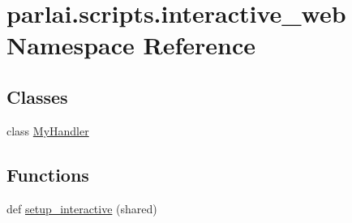 \hypertarget{namespaceparlai_1_1scripts_1_1interactive__web}{}\section{parlai.\+scripts.\+interactive\+\_\+web Namespace Reference}
\label{namespaceparlai_1_1scripts_1_1interactive__web}
\subsection*{Classes}
\begin{DoxyCompactItemize}
\item 
class \hyperlink{classparlai_1_1scripts_1_1interactive__web_1_1MyHandler}{My\+Handler}
\end{DoxyCompactItemize}
\subsection*{Functions}
\begin{DoxyCompactItemize}
\item 
def \hyperlink{namespaceparlai_1_1scripts_1_1interactive__web_abeab09cab4f9e60077ffd5050bff36ef}{setup\+\_\+interactive} (shared)
\end{DoxyCompactItemize}
